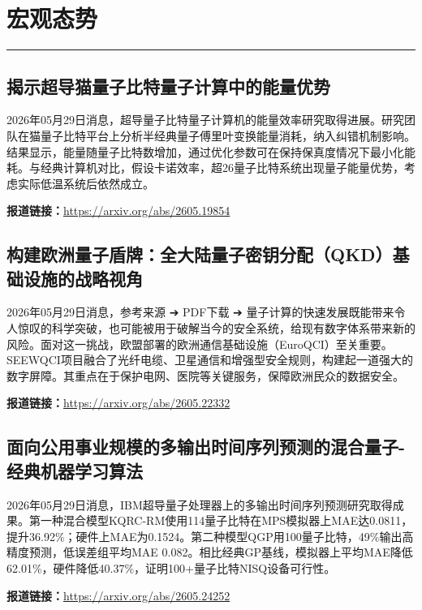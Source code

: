 \documentclass[12pt,a4paper]{ctexart}
\begin{document}
\newpage
\section{宏观态势}
\vspace{-0.5em}
\noindent\rule{\linewidth}{1.5pt}

\subsection{ 揭示超导猫量子比特量子计算中的能量优势 }

2026年05月29日消息，超导量子比特量子计算机的能量效率研究取得进展。研究团队在猫量子比特平台上分析半经典量子傅里叶变换能量消耗，纳入纠错机制影响。结果显示，能量随量子比特数增加，通过优化参数可在保持保真度情况下最小化能耗。与经典计算机对比，假设卡诺效率，超26量子比特系统出现量子能量优势，考虑实际低温系统后依然成立。

\noindent\textbf{报道链接：}\url{https://arxiv.org/abs/2605.19854}

\subsection{ 构建欧洲量子盾牌：全大陆量子密钥分配（QKD）基础设施的战略视角 }

2026年05月29日消息，参考来源
➔
PDF下载
➔
量子计算的快速发展既能带来令人惊叹的科学突破，也可能被用于破解当今的安全系统，给现有数字体系带来新的风险。面对这一挑战，欧盟部署的欧洲通信基础设施（EuroQCI）至关重要。SEEWQCI项目融合了光纤电缆、卫星通信和增强型安全规则，构建起一道强大的数字屏障。其重点在于保护电网、医院等关键服务，保障欧洲民众的数据安全。

\noindent\textbf{报道链接：}\url{https://arxiv.org/abs/2605.22332}

\subsection{ 面向公用事业规模的多输出时间序列预测的混合量子-经典机器学习算法 }

2026年05月29日消息，IBM超导量子处理器上的多输出时间序列预测研究取得成果。第一种混合模型KQRC-RM使用114量子比特在MPS模拟器上MAE达0.0811，提升36.92\%；硬件上MAE为0.1524。第二种模型QGP用100量子比特，49\%输出高精度预测，低误差组平均MAE 0.082。相比经典GP基线，模拟器上平均MAE降低62.01\%，硬件降低40.37\%，证明100+量子比特NISQ设备可行性。

\noindent\textbf{报道链接：}\url{https://arxiv.org/abs/2605.24252}
\end{document}
